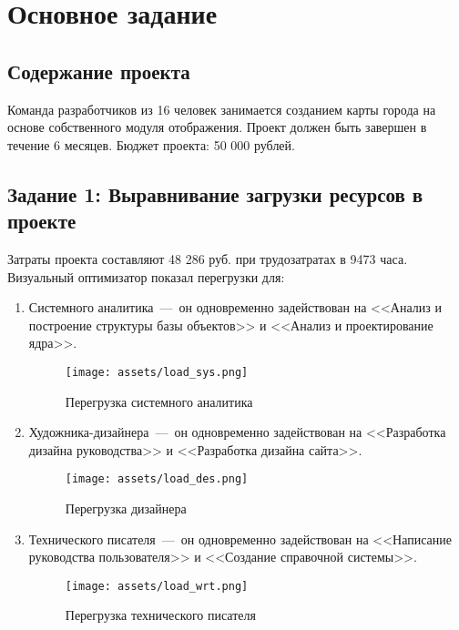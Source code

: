 \chapter{Основное задание}

\section{Содержание проекта}

Команда разработчиков из 16 человек занимается созданием карты города на основе собственного модуля отображения. Проект должен быть завершен в течение 6 месяцев. Бюджет проекта: 50 000 рублей.

\section{Задание 1: Выравнивание загрузки ресурсов в проекте}

Затраты проекта составляют 48 286 руб. при трудозатратах в 9473 часа.  Визуальный оптимизатор показал перегрузки для: 

\begin{enumerate}

\item Системного аналитика~---~он одновременно задействован на <<Анализ и построение структуры базы объектов>> и <<Анализ и проектирование ядра>>.

\begin{figure}[H]
    \begin{center}
    \texttt{[image: assets/load\_sys.png]}
    \caption{Перегрузка системного аналитика}
    \label{fig:2}
    \end{center}
\end{figure}

\item Художника-дизайнера~---~он одновременно задействован на <<Разработка дизайна руководства>> и <<Разработка дизайна сайта>>.

\begin{figure}[H]
    \begin{center}
    \texttt{[image: assets/load\_des.png]}
    \caption{Перегрузка дизайнера}
    \label{fig:2}
    \end{center}
\end{figure}

\item Технического писателя~---~он одновременно задействован на <<Написание руководства пользователя>> и <<Создание справочной системы>>.

\begin{figure}[H]
    \begin{center}
    \texttt{[image: assets/load\_wrt.png]}
    \caption{Перегрузка технического писателя}
    \label{fig:2}
    \end{center}
\end{figure}

\end{enumerate}

